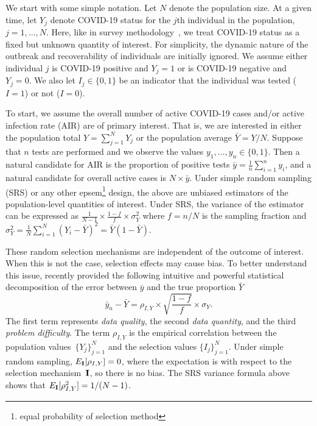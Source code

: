 \documentclass[11pt]{amsart}
\numberwithin{equation}{section}
\theoremstyle{plain}
\def\I{\bf I}
\begin{document}
We start with some simple notation.  Let $N$ denote the population size.  At a given time, let $Y_j$ denote COVID-19 status for the $j$th individual in the population, $j=1,\ldots, N$. Here, like in survey methodology~\citep{Cochran77}, we treat COVID-19 status as a fixed but unknown quantity of interest. For simplicity, the dynamic nature of the outbreak and recoverability of individuals are initially ignored.  We assume either individual $j$ is COVID-19 positive and $Y_j=1$ or is COVID-19 negative and $Y_j=0$. We also let $I_j \in \{0,1\}$ be an indicator that the individual was tested ($I = 1$) or not ($I=0$).

To start, we assume the overall number of active COVID-19 cases and/or active infection rate (AIR) are of primary interest. That is, we are interested in either the population total $Y = \sum_{j=1}^N Y_j$ or the population average $\bar Y = Y/N$. Suppose that $n$ tests are performed and we observe the values $y_1, \ldots, y_n \in \{0,1\}$.  Then a natural candidate for AIR is the proportion of positive tests $\bar y = \frac{1}{n} \sum_{i=1}^n y_i$, and a natural candidate for overall active cases is $N \times \bar y$.
Under simple random sampling (SRS) or any other epsem\footnote{equal probability of selection method} design, the above are unbiased estimators of the population-level quantities of interest.  Under SRS, the variance of the estimator can be expressed as $\frac{1}{N-1} \times \frac{1-f}{f} \times \sigma_Y^2$ where $f = n/N$ is the sampling fraction and $\sigma_Y^2 = \frac{1}{N} \sum_{i=1}^N (Y_i - \bar Y)^2 = \bar Y (1- \bar Y)$.

These random selection mechanisms are independent of the outcome of interest. When this is not the case, selection effects may cause bias. To better understand this issue, \cite{Meng2018} recently provided the following intuitive and powerful statistical decomposition of the error between $\bar y$ and the true proportion $\bar Y$
$$
\bar y_n - \bar Y =  \rho_{I, Y} \times \sqrt{\frac{1-f}{f}} \times \sigma_Y.
$$
The first term represents \emph{data quality}, the second \emph{data quantity}, and the third \emph{problem difficulty}. The term $\rho_{I,Y}$ is the empirical correlation between the population values~$\{ Y_j \}_{j=1}^N$ and the selection values $\{ I_j \}_{j=1}^N$.  Under simple random sampling, $E_{\I} [ \rho_{I,Y} ] = 0$, where the expectation is with respect to the selection mechanism~$\I$, so there is no bias.  The SRS variance formula above shows that $E_{\I} [ \rho_{I,Y}^2 ]  = 1/(N-1)$.
\end{document}
